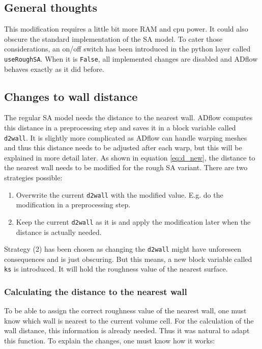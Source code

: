 \subsection{General thoughts}
This modification requires a little bit more RAM and cpu power. It could also
obscure the standard implementation of the SA model. To cater those
considerations, an on/off switch has been introduced in the python layer called
\texttt{useRoughSA}. When it is \texttt{False}, all implemented changes are
disabled and ADflow behaves exactly as it did before.


\subsection{Changes to wall distance}
The regular SA model needs the distance to the nearest wall. ADflow computes
this distance in a preprocessing step and saves it in a block variable called
\texttt{d2wall}. It is slightly more complicated as ADflow can
handle warping meshes and thus this distance needs to be adjusted after each
warp, but this will be explained in more detail later. As shown in equation
\ref{eq:d_new}, the distance to the nearest wall needs to be modified for the
rough SA variant. There are two strategies possible:

\begin{enumerate}
  \item Overwrite the current \texttt{d2wall} with the modified value. E.g. do
        the modification in a preprocessing step.
  \item Keep the current \texttt{d2wall} as it is and apply the modification
        later when the distance is actually needed.
\end{enumerate}

\noindent Strategy (2) has been chosen as changing the \texttt{d2wall} might
have unforeseen consequences and is just obscuring. But this means, a new block
variable called \texttt{ks} is introduced. It will hold the roughness value of
the nearest surface.

\subsubsection{Calculating the distance to the nearest wall}
To be able to assign the correct roughness value of the nearest wall, one must
know which wall is nearest to the current volume cell. For the calculation of
the wall distance, this information is already needed. Thus it was natural to
adapt this function. To explain the changes, one must know how it works:

